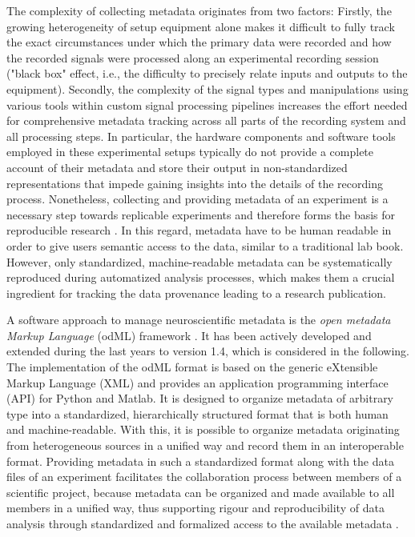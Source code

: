 The complexity of collecting metadata originates from two factors: Firstly, the growing heterogeneity of setup equipment alone makes it difficult to fully track the exact circumstances under which the primary data were recorded and how the recorded signals were processed along an experimental recording session ("black box" effect, i.e., the difficulty to precisely relate inputs and outputs to the equipment). Secondly, the complexity of the signal types and manipulations using various tools within custom signal processing pipelines increases the effort needed for comprehensive metadata tracking across all parts of the recording system and all processing steps. In particular, the hardware components and software tools employed in these experimental setups typically do not provide a complete account of their metadata and store their output in non-standardized representations that impede gaining insights into the details of the recording process. Nonetheless, collecting and providing metadata of an experiment is a necessary step towards replicable experiments and therefore forms the basis for reproducible research \citep{Tebaykin_2017}. In this regard, metadata have to be human readable in order to give users semantic access to the data, similar to a traditional lab book. However, only standardized, machine-readable metadata can be systematically reproduced during automatized analysis processes, which makes them a crucial ingredient for tracking the data provenance leading to a research publication.

A software approach to manage neuroscientific metadata is the \textit{open metadata Markup Language} (odML) framework \citep{Grewe_2011}. It has been actively developed and extended during the last years to version 1.4, which is considered in the following. The implementation of the odML format is based on the generic eXtensible Markup Language (XML) and provides an application programming interface (API) for Python and Matlab. It is designed to organize metadata of arbitrary type into a standardized, hierarchically structured format that is both human and machine-readable. With this, it is possible to organize metadata originating from heterogeneous sources in a unified way and record them in an interoperable format. Providing metadata in such a standardized format along with the data files of an experiment facilitates the collaboration process between members of a scientific project, because metadata can be organized and made available to all members in a unified way, thus supporting rigour and reproducibility of data analysis through standardized and formalized access to the available metadata \citep{Zehl_2016}.

